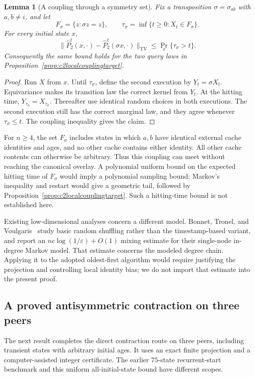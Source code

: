 \documentclass[11pt]{article}
\newtheorem{lemma}[theorem]{Lemma}
\newcommand{\TV}{\mathrm{TV}}
\begin{document}
\begin{lemma}[A coupling through a symmetry set]
\label{lem:c2symmetrycoupling}
Fix a transposition $\sigma=\sigma_{ab}$ with $a,b\ne i$,
and let
\[
 F_\sigma=\{z:\sigma z=z\},\qquad
 \tau_\sigma=\inf\{t\ge0:X_t\in F_\sigma\}.
\]
For every initial state $x$,
\[
 \|\widehat P_2^t(x,\cdot)
       -\widehat P_2^t(\sigma x,\cdot)\|_{\TV}
 \le\Pr_x\{\tau_\sigma>t\}.
\]
Consequently the same bound holds for the two query laws
in Proposition~\ref{prop:c2localcouplingtarget}.
\end{lemma}
\begin{proof}
Run $X$ from $x$. Until $\tau_\sigma$, define the second
execution by $Y_t=\sigma X_t$. Equivariance makes its
transition law the correct kernel from $Y_t$. At the
hitting time, $Y_{\tau_\sigma}=X_{\tau_\sigma}$.
Thereafter use identical random choices in both executions.
The second execution still has the correct marginal law,
and they agree whenever $\tau_\sigma\le t$.
The coupling inequality gives the claim.
\end{proof}

For $n\ge4$, the set $F_\sigma$ includes states in which
$a,b$ have identical external cache identities and ages,
and no other cache contains either identity. All other
cache contents can otherwise be arbitrary. Thus this
coupling can meet without reaching the canonical overlay.
A polynomial uniform bound on the expected hitting time
of $F_\sigma$ would imply a polynomial sampling bound:
Markov's inequality and restart would give a geometric
tail, followed by Proposition~\ref{prop:c2localcouplingtarget}.
Such a hitting-time bound is not established here.

Existing low-dimensional analyses concern a different model.
Bonnet, Tronel, and Voulgaris~\cite{cyclonperformance}
study basic random shuffling rather than the timestamp-based
variant, and report an $nc\log(1/\varepsilon)+O(1)$ mixing
estimate for their single-node in-degree Markov model.
That estimate concerns the modeled degree chain. Applying it
to the adopted oldest-first algorithm would require justifying
the projection and controlling local identity bias; we do not
import that estimate into the present proof.

\subsection{A proved antisymmetric contraction on three peers}

The next result completes the direct contraction route on three
peers, including transient states with arbitrary initial ages.
It uses an exact finite projection and a computer-assisted
integer certificate. The earlier $75$-state recurrent-start
benchmark and this uniform all-initial-state bound have
different scopes.
\end{document}
